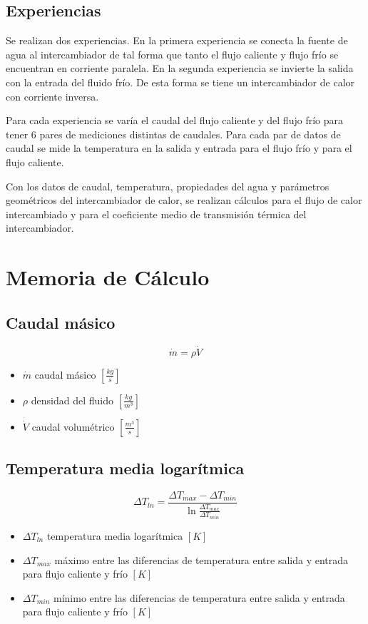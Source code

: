 \documentclass[letterpaper,11pt]{article} %
\begin{document}
\subsection{Experiencias}
Se realizan dos experiencias. En la primera experiencia se conecta la fuente de agua al intercambiador de tal forma que tanto el flujo caliente y flujo frío se encuentran en corriente paralela. En la segunda experiencia se invierte la salida con la entrada del fluido frío. De esta forma se tiene un intercambiador de calor con corriente inversa.

Para cada experiencia se varía el caudal del flujo caliente y del flujo frío para tener 6 pares de mediciones distintas de caudales. Para cada par de datos de caudal se mide la temperatura en la salida y entrada para el flujo frío y para el flujo caliente.

Con los datos de caudal, temperatura, propiedades del agua y parámetros geométricos del intercambiador de calor, se realizan cálculos para el flujo de calor intercambiado y para el coeficiente medio de transmisión térmica del intercambiador. 

\newpage
\section{Memoria de Cálculo}
\subsection{Caudal másico}
\begin{equation}
\dot{m} = \rho \dot{V}
\end{equation}
\begin{itemize}
	\item $\dot{m}$ caudal másico $[\frac{kg}{s}]$
	\item $\rho$ densidad del fluido $[\frac{kg}{m^3}]$
	\item $\dot{V}$ caudal volumétrico $[\frac{m^3}{s}]$
\end{itemize}
\subsection{Temperatura media logarítmica}
\begin{equation}
\Delta T_{ln} = \frac{\Delta T_{max}-\Delta T_{min}}{\ln{ \frac{\Delta T_{max}}{\Delta T_{min}}}}
\end{equation}
\begin{itemize}
	\item $\Delta T_{ln}$ temperatura media logarítmica $[K]$
	\item $\Delta T_{max}$ máximo entre las diferencias de temperatura entre salida y entrada para flujo caliente y frío $[K]$
	\item $\Delta T_{min}$ mínimo entre las diferencias de temperatura entre salida y entrada para flujo caliente y frío $[K]$
\end{itemize}
\end{document}
